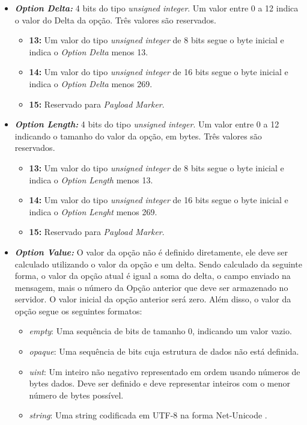 \begin{itemize}
	\item \textit{\textbf{Option Delta: }}4 bits do tipo \textit{unsigned integer}. Um valor entre 0 a 12 indica o valor do Delta da opção. Três valores são reservados.
	\begin{itemize}
		\item \textbf{13: }Um valor do tipo \textit{unsigned integer} de 8 bits segue o byte inicial e indica o \textit{Option Delta} menos 13.
		\item \textbf{14: }Um valor do tipo \textit{unsigned integer} de 16 bits segue o byte inicial e indica o \textit{Option Delta} menos 269.
		\item \textbf{15: }Reservado para \textit{Payload Marker}.
	\end{itemize}
	\item \textit{\textbf{Option Length: }} 4 bits do tipo \textit{unsigned integer}. Um valor entre 0 a 12  indicando o tamanho do valor da opção, em bytes. Três valores são reservados.
	\begin{itemize}
		\item \textbf{13: }Um valor do tipo \textit{unsigned integer} de 8 bits segue o byte inicial e indica o \textit{Option Length} menos 13.
		\item \textbf{14: }Um valor do tipo \textit{unsigned integer} de 16 bits segue o byte inicial e indica o \textit{Option Lenght} menos 269.
		\item \textbf{15: }Reservado para \textit{Payload Marker}.
	\end{itemize}
	\item \textit{\textbf{Option Value:}} O valor da opção não é definido diretamente, ele deve ser calculado utilizando o valor da opção e um delta. Sendo calculado da seguinte forma, o valor da opção atual é igual a soma do delta, o campo enviado na mensagem, mais o número da Opção anterior que deve ser armazenado no servidor. O valor inicial da opção anterior será zero. Além disso, o valor da opção segue os seguintes formatos:
	\begin{itemize}
		\item \textit{empty}: Uma sequência de bits de tamanho 0, indicando um valor vazio.
		\item \textit{opaque}: Uma sequência de bits cuja estrutura de dados não está definida.
		\item \textit{uint}: Um inteiro não negativo representado em ordem usando números de bytes dados. Deve ser definido e deve representar inteiros com o menor número de bytes possível.
		\item \textit{string}: Uma string codificada em UTF-8 na forma Net-Unicode \cite{rfc7252_CoAP}.	
	\end{itemize}
\end{itemize}
